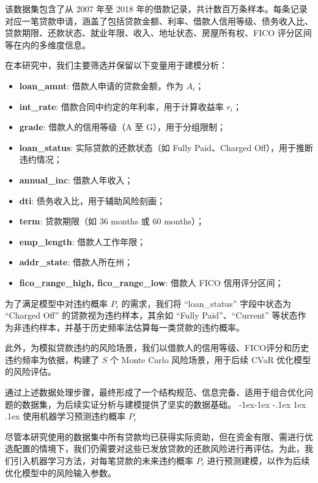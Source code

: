 \documentclass[nonblindrev]{write_paper}
\makeatletter
\renewcommand\subsection{\@startsection{subsection}{2}{\z@}%
                                     {-1ex\@plus -1ex \@minus -.1ex}%
                                     {1ex \@plus .1ex}%
                                     {\normalfont \normalsize \bfseries}}
\makeatother
\begin{document}
该数据集包含了从 2007 年至 2018 年的借款记录，共计数百万条样本。每条记录对应一笔贷款申请，涵盖了包括贷款金额、利率、借款人信用等级、债务收入比、贷款期限、还款状态、就业年限、收入、地址状态、房屋所有权、FICO 评分区间等在内的多维度信息。

在本研究中，我们主要筛选并保留以下变量用于建模分析：

\begin{itemize}
  \item \textbf{loan\_amnt}: 借款人申请的贷款金额，作为 $A_i$；
  \item \textbf{int\_rate}: 借款合同中约定的年利率，用于计算收益率 $r_i$；
  \item \textbf{grade}: 借款人的信用等级（A 至 G），用于分组限制；
  \item \textbf{loan\_status}: 实际贷款的还款状态（如 Fully Paid、Charged Off），用于推断违约情况；
  \item \textbf{annual\_inc}: 借款人年收入；
  \item \textbf{dti}: 债务收入比，用于辅助风险刻画；
  \item \textbf{term}: 贷款期限（如 36 months 或 60 months）；
  \item \textbf{emp\_length}: 借款人工作年限；
  \item \textbf{addr\_state}: 借款人所在州；
  \item \textbf{fico\_range\_high, fico\_range\_low}: 借款人 FICO 信用评分区间；
\end{itemize}

为了满足模型中对违约概率 $P_i$ 的需求，我们将 ``loan\_status'' 字段中状态为 ``Charged Off'' 的贷款视为违约样本，其余如 ``Fully Paid''、``Current'' 等状态作为非违约样本，并基于历史频率法估算每一类贷款的违约概率。

此外，为模拟贷款违约的风险场景，我们以借款人的信用等级、FICO评分和历史违约频率为依据，构建了 $S$ 个 Monte Carlo 风险场景，用于后续 CVaR 优化模型的风险评估。

通过上述数据处理步骤，最终形成了一个结构规范、信息完备、适用于组合优化问题的数据集，为后续实证分析与建模提供了坚实的数据基础。
\subsection{使用机器学习预测违约概率 $P_i$}
\label{subsec:predict_p_i}

尽管本研究使用的数据集中所有贷款均已获得实际资助，但在资金有限、需进行优选配置的情境下，我们仍需要对这些已发放贷款的还款风险进行再评估。为此，我们引入机器学习方法，对每笔贷款的未来违约概率 $P_i$ 进行预测建模，以作为后续优化模型中的风险输入参数。
\end{document}
